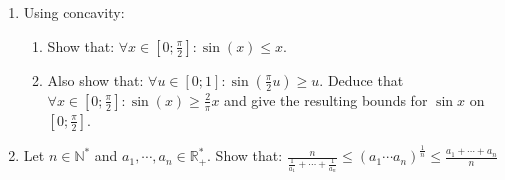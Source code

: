 \documentclass[12pt]{article}
\begin{document}
\newpage

\section{}
\begin{enumerate}
  \item Using concavity:
  \begin{enumerate}
      \item Show that: $\forall x \in [0; \frac{\pi}{2}] : \sin(x) \leq x$.
      
      \item Also show that: $\forall u \in [0; 1] : \sin(\frac{\pi}{2}u) \geq u$. Deduce that $\forall x \in [0; \frac{\pi}{2}] : \sin(x) \geq \frac{2}{\pi}x$ and give the resulting bounds for $\sin x$ on $[0; \frac{\pi}{2}]$.
  \end{enumerate}
  
  \item Let $n \in \mathbb{N}^*$ and $a_1, \cdots, a_n \in \mathbb{R}^*_+$. Show that:
  $\frac{n}{\frac{1}{a_1} + \cdots + \frac{1}{a_n}} \leq (a_1 \cdots a_n)^{\frac{1}{n}} \leq \frac{a_1 + \cdots + a_n}{n}$
\end{enumerate}

\newpage
\end{document}
